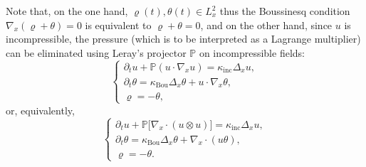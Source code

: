 \documentclass[10pt]{amsart}
\theoremstyle{definition}\newtheorem{defi}[theo]{Definition}\newtheorem{rema}[theo]{Remark}\newtheorem{exam}[theo]{Example}\newtheorem{exem}[theo]{Example}\newtheorem{nota}[theo]{Notation}
\newcommand{\Inc}{\mathrm{inc}}
\newcommand{\Bou}{\mathrm{Bou}}
\newcommand{\bbP}{\mathbb{P}}
\begin{document}
Note that, on the one hand, $\varrho(t), \theta(t) \in L^2_x$ thus the Boussinesq condition $\nabla_x (\varrho + \theta) = 0$ is equivalent to $\varrho + \theta = 0$, and on the other hand, since $u$ is incompressible, the pressure (which is to be interpreted as a Lagrange multiplier) can be eliminated using Leray's projector $\bbP$ on incompressible fields:
\begin{equation}\label{eq:NSF_1}
\begin{cases}
\partial_t u + \bbP \left(u \cdot \nabla_x u \right) = \kappa_\Inc \Delta_x u,\\
\partial_t \theta = \kappa_\Bou \Delta_x \theta + u \cdot \nabla_x \theta, \\
\varrho =- \theta,
\end{cases}
\end{equation}
or, equivalently,
\begin{equation}\label{eq:NSF_2}
\begin{cases}
\partial_t u + \bbP \big[\nabla_x \cdot (u \otimes u) \big] = \kappa_\Inc \Delta_x u,\\
\partial_t \theta = \kappa_\Bou \Delta_x \theta + \nabla_x \cdot (u \theta), \\
\varrho = -\theta.
\end{cases}
\end{equation}
\end{document}
